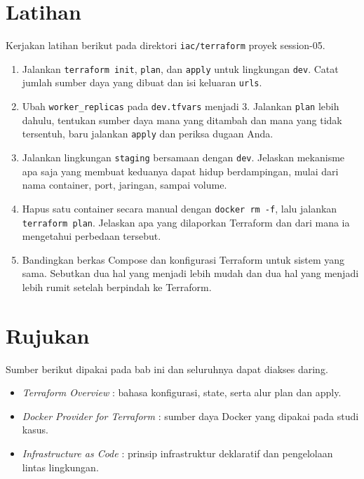 \section{Latihan}

Kerjakan latihan berikut pada direktori \texttt{iac/terraform} proyek session-05.

\begin{enumerate}
  \item Jalankan \texttt{terraform init}, \texttt{plan}, dan \texttt{apply} untuk lingkungan \texttt{dev}. Catat jumlah sumber daya yang dibuat dan isi keluaran \texttt{urls}.
  \item Ubah \texttt{worker\_replicas} pada \texttt{dev.tfvars} menjadi 3. Jalankan \texttt{plan} lebih dahulu, tentukan sumber daya mana yang ditambah dan mana yang tidak tersentuh, baru jalankan \texttt{apply} dan periksa dugaan Anda.
  \item Jalankan lingkungan \texttt{staging} bersamaan dengan \texttt{dev}. Jelaskan mekanisme apa saja yang membuat keduanya dapat hidup berdampingan, mulai dari nama container, port, jaringan, sampai volume.
  \item Hapus satu container secara manual dengan \texttt{docker rm -f}, lalu jalankan \texttt{terraform plan}. Jelaskan apa yang dilaporkan Terraform dan dari mana ia mengetahui perbedaan tersebut.
  \item Bandingkan berkas Compose dan konfigurasi Terraform untuk sistem yang sama. Sebutkan dua hal yang menjadi lebih mudah dan dua hal yang menjadi lebih rumit setelah berpindah ke Terraform.
\end{enumerate}

\section{Rujukan}

Sumber berikut dipakai pada bab ini dan seluruhnya dapat diakses daring.

\begin{itemize}
  \item \textit{Terraform Overview} \cite{doc-terraform}: bahasa konfigurasi, state, serta alur plan dan apply.
  \item \textit{Docker Provider for Terraform} \cite{doc-tf-docker}: sumber daya Docker yang dipakai pada studi kasus.
  \item \textit{Infrastructure as Code} \cite{morris2021iac}: prinsip infrastruktur deklaratif dan pengelolaan lintas lingkungan.
\end{itemize}
